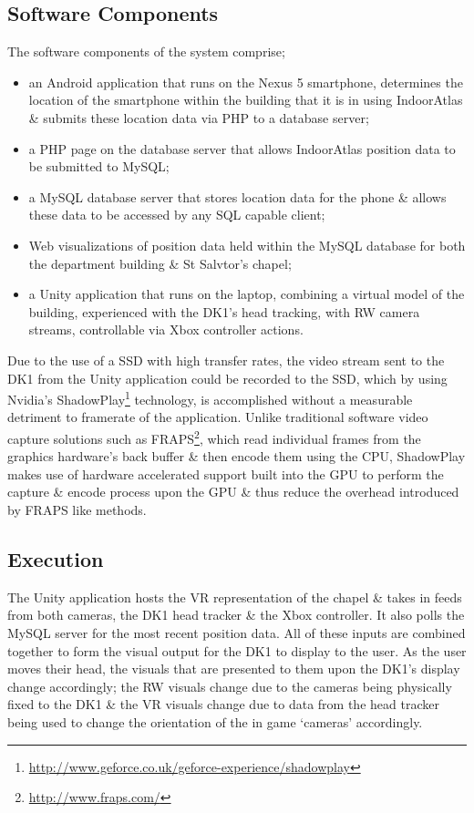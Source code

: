 \subsection{Software Components}
The software components of the system comprise;
\begin{itemize}
	\item an Android application that runs on the Nexus 5 smartphone, determines the location of the smartphone within the building that it is in using IndoorAtlas \& submits these location data via PHP to a database server;
	\item a PHP page on the database server that allows IndoorAtlas position data to be submitted to MySQL;
	\item a MySQL database server that stores location data for the phone \& allows these data to be accessed by any SQL capable client;
	\item Web visualizations of position data held within the MySQL database for both the department building \& St Salvtor's chapel;
	\item a Unity application that runs on the laptop, combining a virtual model of the building, experienced with the DK1's head tracking, with RW camera streams, controllable via Xbox controller actions.
\end{itemize}

Due to the use of a SSD with high transfer rates, the video stream sent to the DK1 from the Unity application could be recorded to the SSD, which by using Nvidia's ShadowPlay\footnote{\url{http://www.geforce.co.uk/geforce-experience/shadowplay}} technology, is accomplished without a measurable detriment to framerate of the application. Unlike traditional software video capture solutions such as FRAPS\footnote{\url{http://www.fraps.com/}}, which read individual frames from the graphics hardware's back buffer \& then encode them using the CPU, ShadowPlay makes use of hardware accelerated support built into the GPU to perform the capture \& encode process upon the GPU \& thus reduce the overhead introduced by FRAPS like methods.


\subsection{Execution}
The Unity application hosts the VR representation of the chapel \& takes in feeds from both cameras, the DK1 head tracker \& the Xbox controller. It also polls the MySQL server for the most recent position data. All of these inputs are combined together to form the visual output for the DK1 to display to the user. As the user moves their head, the visuals that are presented to them upon the DK1's display change accordingly; the RW visuals change due to the cameras being physically fixed to the DK1 \& the VR visuals change due to data from the head tracker being used to change the orientation of the in game `cameras' accordingly.

